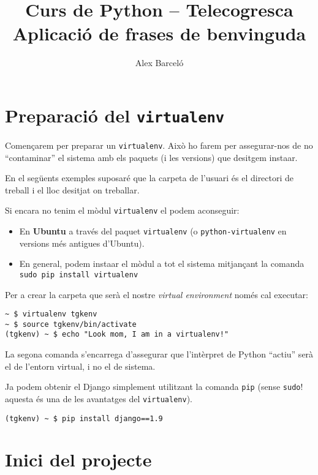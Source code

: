 \documentclass[11pt,a4paper]{article}
\author{Alex Barceló}
\title{Curs de Python -- Telecogresca \\ {\sc Aplicació de frases de benvinguda}}
\begin{document}
\maketitle

\setcounter{section}{-1}
\section{Preparació del \texttt{virtualenv}}

Començarem per preparar un \verb+virtualenv+. Això ho farem per assegurar-nos de no ``contaminar'' el sistema amb els paquets (i les versions) que desitgem insta\lgem{}ar.

En el següents exemples suposaré que la carpeta de l'usuari és el directori de treball i el lloc desitjat on treballar.

Si encara no tenim el mòdul \verb+virtualenv+ el podem aconseguir:
\begin{itemize}
\item En \textbf{Ubuntu} a través del paquet \verb+virtualenv+ (o \verb+python-virtualenv+ en versions més antigues d'Ubuntu).
\item En general, podem insta\lgem{}ar el mòdul a tot el sistema mitjançant la comanda \\\verb+sudo pip install virtualenv+
\end{itemize}

Per a crear la carpeta que serà el nostre \emph{virtual environment} només cal executar:

\begin{verbatim}
~ $ virtualenv tgkenv
~ $ source tgkenv/bin/activate
(tgkenv) ~ $ echo "Look mom, I am in a virtualenv!"
\end{verbatim}

La segona comanda s'encarrega d'assegurar que l'intèrpret de Python ``actiu'' serà el de l'entorn virtual, i no el de sistema.

Ja podem obtenir el Django simplement utilitzant la comanda \verb+pip+ (sense \verb+sudo+! aquesta és una de les avantatges del \verb+virtualenv+).

\begin{verbatim}
(tgkenv) ~ $ pip install django==1.9
\end{verbatim}

\section{Inici del projecte}
\end{document}
